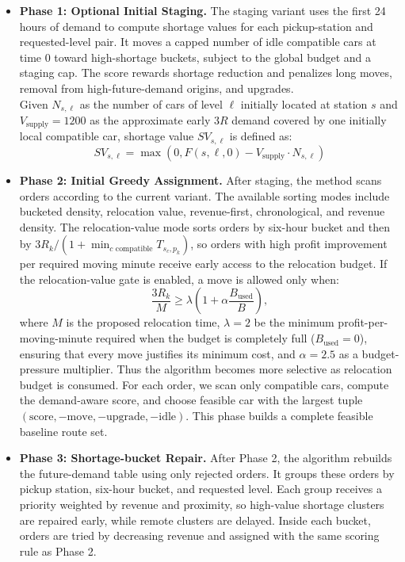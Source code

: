 \documentclass[10pt,a4paper]{article}
\begin{document}
\begin{itemize}[itemsep=2pt, parsep=0pt, topsep=4pt]
    \item \textbf{Phase 1: Optional Initial Staging.} The staging variant uses the first 24 hours of demand to compute shortage values for each pickup-station and requested-level pair.  It moves a capped number of idle compatible cars at time 0 toward high-shortage buckets, subject to the global budget and a staging cap.  The score rewards shortage reduction and
    penalizes long moves, removal from high-future-demand origins, and upgrades.\\
    Given $N_{s, \ell}$ as the number of cars of level $\ell$ initially located at station $s$ and $V_{\text{supply}}=1200$ as the approximate early $3R$ demand covered by one
    initially local compatible car, shortage value $SV_{s, \ell}$ is defined as:
    \[SV_{s, \ell} = \max\left(0, F(s, \ell, 0) - V_{\text{supply}} \cdot N_{s, \ell}\right)\]

    \item \textbf{Phase 2: Initial Greedy Assignment.} After staging, the method
    scans orders according to the current variant.  The available sorting modes
    include bucketed density, relocation value, revenue-first, chronological,
    and revenue density.  The relocation-value mode sorts orders by six-hour
    bucket and then by $3R_k / (1+\min_{c\text{ compatible}}T_{s_c,p_k})$,
    so orders with high profit improvement per required moving minute receive
    early access to the relocation budget.  If the relocation-value gate is
    enabled, a move is allowed only when:
    \[
    \frac{3R_k}{M}\ge \lambda\left(1+\alpha\frac{B_{\text{used}}}{B}\right),
    \]
    where $M$ is the proposed relocation time, $\lambda=2$ be the minimum profit-per-moving-minute required when the budget is completely full ($B_{\text{used}} = 0$), ensuring that every move justifies its minimum cost, and $\alpha=2.5$ as a budget-pressure multiplier.  
    Thus the algorithm becomes more
    selective as relocation budget is consumed.  For each order, we
    scan only compatible cars, compute the demand-aware score, and choose
    feasible car with the largest tuple $(\text{score},-\text{move},-\text{upgrade},-\text{idle}).$
    This phase builds a complete feasible baseline route set.

    \item \textbf{Phase 3: Shortage-bucket Repair.} After Phase 2, the algorithm
    rebuilds the future-demand table using only rejected orders.  It groups
    these orders by pickup station, six-hour bucket, and requested level.  Each
    group receives a priority weighted by revenue and proximity,
    so high-value shortage clusters are repaired early, while remote clusters
    are delayed.  Inside each bucket, orders are tried by decreasing revenue and
    assigned with the same scoring rule as Phase 2.


\end{itemize}
\end{document}

